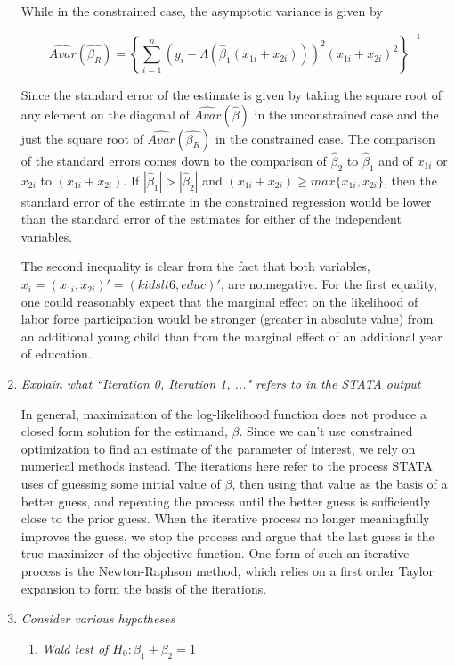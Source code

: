 \documentclass{article}
\begin{document}
\begin{enumerate}
While in the constrained case, the asymptotic variance is given by

\[ \hat{Avar} (\hat{\beta_R}) = \left \{ \sum_{i=1}^{n} (y_i - \Lambda (\hat{\beta}_1(x_{1i} + x_{2i})))^2 (x_{1i} + x_{2i})^2 \right \}^{-1} \]

Since the standard error of the estimate is given by taking the square root of any element on the diagonal of $\hat{Avar} (\hat{\beta})$ in the unconstrained case and the just the square root of $\hat{Avar} (\hat{\beta_R})$ in the constrained case. The comparison of the standard errors comes down to the comparison of $\hat{\beta}_2$ to $\hat{\beta}_1$ and of $x_{1i}$ or $x_{2i}$ to $(x_{1i} + x_{2i})$. If $|\hat{\beta}_1| > |\hat{\beta}_2|$ and $(x_{1i} + x_{2i}) \geq max\{x_{1i}, x_{2i}\}$, then the standard error of the estimate in the constrained regression would be lower than the standard error of the estimates for either of the independent variables.

The second inequality is clear from the fact that both variables, $x_i = (x_{1i}, x_{2i})' = (kidslt6, educ)'$, are nonnegative. For the first equality, one could reasonably expect that the marginal effect on the likelihood of labor force participation would be stronger (greater in absolute value) from an additional young child than from the marginal effect of an additional year of education.

\item \textit{Explain what ``Iteration 0, Iteration 1, ..." refers to in the STATA output}

In general, maximization of the log-likelihood function does not produce a closed form solution for the estimand, $\beta$. Since we can't use constrained optimization to find an estimate of the parameter of interest, we rely on numerical methods instead. The iterations here refer to the process STATA uses of guessing some initial value of $\beta$, then using that value as the basis of a better guess, and repeating the process until the better guess is sufficiently close to the prior guess. When the iterative process no longer meaningfully improves the guess, we stop the process and argue that the last guess is the true maximizer of the objective function. One form of such an iterative process is the Newton-Raphson method, which relies on a first order Taylor expansion to form the basis of the iterations.

\item \textit{Consider various hypotheses}

\begin{enumerate}
\item \textit{Wald test of $H_0: \beta_1 + \beta_2 = 1$}


\end{enumerate}
\end{enumerate}
\end{document}
